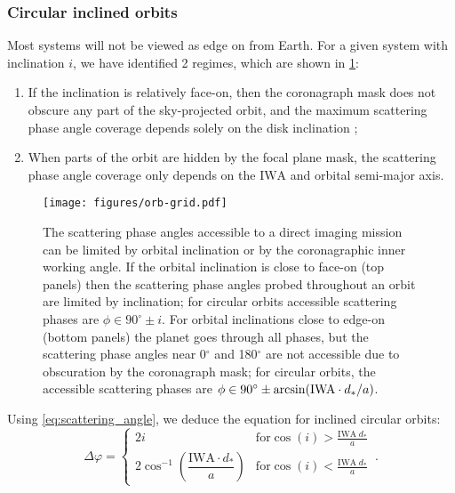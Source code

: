 \documentclass[
    usenatbib,
]{mnras}
\newcommand{\IWA}{\ensuremath{\mathrm{IWA}}}
\begin{document}

\subsubsection{Circular inclined orbits}

Most systems will not be viewed as edge on from Earth.
%
For a given system with inclination $i$, we have identified 2 regimes, which are shown in \cref{fig:orb-grid}:

\begin{enumerate}
    \item If the inclination is relatively face-on, then the coronagraph mask does not obscure any part of the sky-projected orbit, and the maximum scattering phase angle coverage depends solely on the disk inclination ;
    \item When parts of the orbit  are hidden by the focal plane mask, the scattering phase angle coverage only depends on the \IWA{} and orbital semi-major axis. 
\end{enumerate}

\begin{figure}%
   \centering
   \texttt{[image: figures/orb-grid.pdf]}
   \caption{
        The scattering phase angles accessible to a direct imaging mission can be limited by orbital inclination or by the coronagraphic inner working angle.
        If the orbital inclination is close to face-on (top panels) then the scattering phase angles probed throughout an orbit are limited by inclination; for circular orbits accessible scattering phases are $\phi \in 90^\circ \pm i$. 
        For orbital inclinations close to edge-on (bottom panels) the planet goes through all phases, but the scattering phase angles near 0$^\circ$ and 180$^\circ$ are not accessible due to obscuration by the coronagraph mask; for circular orbits, the accessible scattering phases are $\phi \in 90^\circ \pm \arcsin({\rm IWA}\cdot d_*/a)$.
    }
    \label{fig:orb-grid}
\end{figure}

Using \cref{eq:scattering_angle}, we deduce the equation for inclined circular orbits: 
\begin{equation}
\label{eq:Delta_phi_max}
    \Delta \varphi = 
    \begin{cases}
        2 i & \textrm{for} \cos(i) > \frac{\mathrm{IWA}\; d_* }{a}
  \\ 
        2  \cos^{-1}\left(\dfrac{\mathrm{IWA}\cdot d_* }{a}\right)  & \textrm{for} \cos(i) < \frac{\mathrm{IWA}\; d_* }{a}
    \end{cases}\,.
\end{equation}
\end{document}
